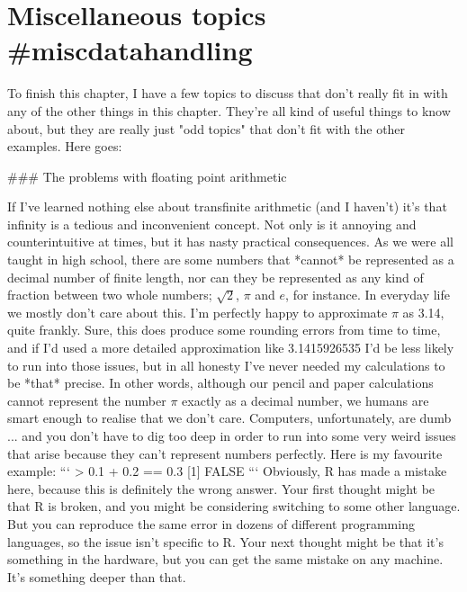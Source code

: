 \section{Miscellaneous topics {#miscdatahandling}}

To finish this chapter, I have a few topics to discuss that don't really fit in with any of the other things in this chapter. They're all kind of useful things to know about, but they are really just "odd topics" that don't fit with the other examples. Here goes:

### The problems with floating point arithmetic

If I've learned nothing else about transfinite arithmetic (and I haven't) it's that infinity is a tedious and inconvenient concept. Not only is it annoying and counterintuitive at times, but it has nasty practical consequences. As we were all taught in high school, there are some numbers that *cannot* be represented as a decimal number of finite length, nor can they be represented as any kind of fraction between two whole numbers; $\sqrt{2}$, $\pi$ and $e$, for instance. In everyday life we mostly don't care about this. I'm perfectly happy to approximate $\pi$ as 3.14, quite frankly. Sure, this does produce some rounding errors from time to time, and if I'd used a more detailed approximation like 3.1415926535 I'd be less likely to run into those issues, but in all honesty I've never needed my calculations to be *that* precise. In other words, although our pencil and paper calculations cannot represent the number $\pi$ exactly as a decimal number, we humans are smart enough to realise that we don't care. Computers, unfortunately, are dumb ... and you don't have to dig too deep in order to run into some very weird issues that arise because they can't represent numbers perfectly. Here is my favourite example: 
```
> 0.1 + 0.2 == 0.3
[1] FALSE
```
Obviously, R has made a mistake here, because this is definitely the wrong answer. Your first thought might be that R is broken, and you might be considering switching to some other language. But you can reproduce the same error in dozens of different programming languages, so the issue isn't specific to R. Your next thought might be that it's something in the hardware, but you can get the same mistake on any machine. It's something deeper than that. 

